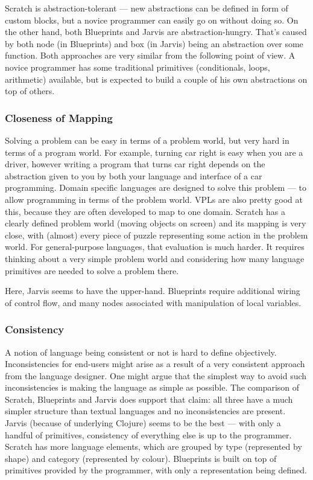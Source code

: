 \documentclass[english,mgr,shortabstract]{iithesis}
\begin{document}
Scratch is abstraction-tolerant --- new abstractions can be defined in form of
custom blocks, but a novice programmer can easily go on without doing so.
On the other hand, both Blueprints and Jarvis are abstraction-hungry.
That’s caused by both node (in Blueprints) and box (in Jarvis) being an
abstraction over some function.
Both approaches are very similar from the following point of view.
A novice programmer has some traditional primitives (conditionals, loops,
arithmetic) available, but is expected to build a couple of his own abstractions
on top of others.

\subsubsection*{Closeness of Mapping}
Solving a problem can be easy in terms of a problem world, but very hard in
terms of a program world.
For example, turning car right is easy when you are a driver, however writing a
program that turns car right depends on the abstraction given to you by both
your language and interface of a car programming.
Domain specific languages are designed to solve this problem --- to allow
programming in terms of the problem world.
VPLs are also pretty good at this, because they are often developed to map to
one domain.
Scratch has a clearly defined problem world (moving objects on screen) and its
mapping is very close, with (almost) every piece of puzzle representing some
action in the problem world.
For general-purpose languages, that evaluation is much harder.
It requires thinking about a very simple problem world and considering how many
language primitives are needed to solve a problem there.

Here, Jarvis seems to have the upper-hand.
Blueprints require additional wiring of control flow, and many nodes associated
with manipulation of local variables.

\subsubsection*{Consistency}
A notion of language being consistent or not is hard to define objectively.
Inconsistencies for end-users might arise as a result of a very consistent
approach from the language designer.
One might argue that the simplest way to avoid such inconsistencies is making
the language as simple as possible.
The comparison of Scratch, Blueprints and Jarvis does support that claim: all
three have a much simpler structure than textual languages and no
inconsistencies are present.
Jarvis (because of underlying Clojure) seems to be the best --- with only a
handful of primitives, consistency of everything else is up to the programmer.
Scratch has more language elements, which are grouped by type (represented by
shape) and category (represented by colour).
Blueprints is built on top of primitives provided by the programmer, with only a
representation being defined.
\end{document}
